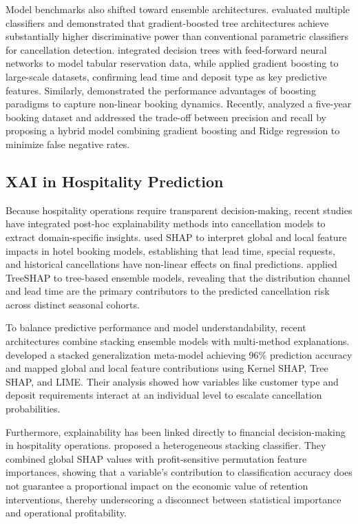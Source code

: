 \documentclass[pdflatex,sn-mathphys-ay]{sn-jnl}%
\theoremstyle{thmstyleone}%
\theoremstyle{thmstyletwo}%
\theoremstyle{thmstylethree}%
\begin{document}
Model benchmarks also shifted toward ensemble architectures. \cite{yoo2024predicting} evaluated multiple classifiers and demonstrated that gradient-boosted tree architectures achieve substantially higher discriminative power than conventional parametric classifiers for cancellation detection. \cite{yang2024predicting} integrated decision trees with feed-forward neural networks to model tabular reservation data, while \cite{luo2025hotel} applied gradient boosting to large-scale datasets, confirming lead time and deposit type as key predictive features. Similarly, \cite{febrian2024hotel} demonstrated the performance advantages of boosting paradigms to capture non-linear booking dynamics. Recently, \cite{ampountolas2025predicting} analyzed a five-year booking dataset and addressed the trade-off between precision and recall by proposing a hybrid model combining gradient boosting and Ridge regression to minimize false negative rates.

\subsection{XAI in Hospitality Prediction}
Because hospitality operations require transparent decision-making, recent studies have integrated post-hoc explainability methods into cancellation models to extract domain-specific insights. \cite{gomez2025machine} used SHAP to interpret global and local feature impacts in hotel booking models, establishing that lead time, special requests, and historical cancellations have non-linear effects on final predictions.
\cite{herrera2024machine} applied TreeSHAP to tree-based ensemble models, revealing that the distribution channel and lead time are the primary
contributors to the predicted cancellation risk across distinct seasonal cohorts.

To balance predictive performance and model understandability, recent architectures combine stacking ensemble models with multi-method explanations. \cite{talal2025hotel} developed a stacked generalization meta-model achieving 96\% prediction accuracy and mapped global and local feature contributions using Kernel SHAP, Tree SHAP, and LIME. Their analysis showed how variables like customer type and deposit requirements interact at an individual level to escalate cancellation probabilities. 

Furthermore, explainability has been linked directly to financial decision-making in hospitality operations. \cite{liu2025explainable} proposed a heterogeneous stacking classifier. They combined global SHAP values with profit-sensitive permutation feature importances, showing that a variable's contribution to classification accuracy does not guarantee a proportional impact on the economic value of retention interventions, thereby underscoring a disconnect between statistical importance and operational profitability. 
\end{document}
